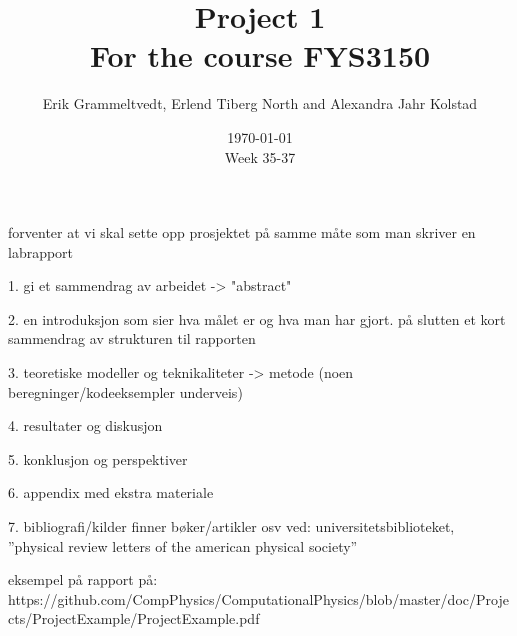 \documentclass{article}
\begin{document}
\addtocounter{page}{0}

\title{Project 1 \\
      \large For the course FYS3150}
\date{\today \\
    \vspace{1mm}
    \large Week 35-37}

\author{Erik Grammeltvedt, Erlend Tiberg North and Alexandra Jahr Kolstad}

\maketitle

forventer at vi skal sette opp prosjektet på samme måte som man skriver en labrapport

1. gi et sammendrag av arbeidet -> "abstract"

2. en introduksjon som sier hva målet er og hva man har gjort. på slutten et kort sammendrag av strukturen til rapporten

3. teoretiske modeller og teknikaliteter -> metode (noen beregninger/kodeeksempler underveis)

4. resultater og diskusjon

5. konklusjon og perspektiver

6. appendix med ekstra materiale

7. bibliografi/kilder
      finner bøker/artikler osv ved: universitetsbiblioteket, ''physical review letters of the american physical society''

eksempel på rapport på: https://github.com/CompPhysics/ComputationalPhysics/blob/master/doc/Projects/ProjectExample/ProjectExample.pdf


\vspace{1cm}
\end{document}
